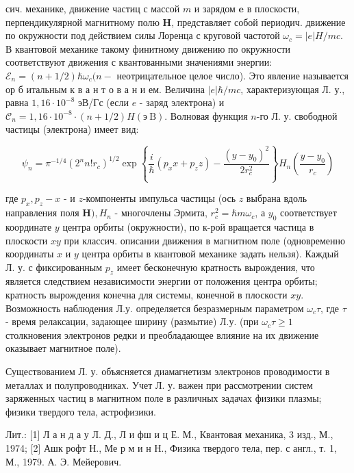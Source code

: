 \documentclass[10pt]{article}
\begin{document}
сич. механике, движение частиц с массой $m$ и зарядом $\boldsymbol{e}$ в плоскости, перпендикулярной магнитному полю $\boldsymbol{H}$, представляет собой периодич. движение по окружности под действием силы Лоренца с круговой частотой $\omega_{c}=|e| H / m c$. В квантовой механике такому финитному движению по окружности соответствуют движения с квантованными значениями энергии: $\mathscr{E}_{n}=(n+1 / 2) \hbar \omega_{c}(n-$ неотрицательное целое число). Это явление называется ор б итальным к в а н т о в а н и ем. Величина $|e| \hbar / m c$, характеризующая Л. у., равна $1,16 \cdot 10^{-8}$ эВ/Гс (если $e$ - заряд электрона) и $\mathscr{C}_{n}=1,16 \cdot 10^{-8} \cdot(n+1 / 2) H(э \mathrm{~B})$. Волновая функция $n$-го Л. у. свободной частицы (электрона) имеет вид:



\[

\psi_{n}=\pi^{-1 / 4}\left(2^{n} n ! r_{c}\right)^{1 / 2} \exp \left\{\frac{i}{\hbar}\left(p_{x} x+p_{z} z\right)-\frac{\left(y-y_{0}\right)^{2}}{2 r_{c}^{2}}\right\} H_{n}\left(\frac{y-y_{0}}{r_{c}}\right)

\]



где $p_{x}, p_{z}-x$ - и $z$-компоненты импульса частицы (ось $z$ выбрана вдоль направления поля $\boldsymbol{H}), H_{n}$ - многочлены Эрмита, $r_{c}^{2}=\hbar m \omega_{c}$, а $y_{0}$ соответствует координате $y$ центра орбиты (окружности), по к-рой вращается частица в плоскости $x y$ при классич. описании движения в магнитном поле (одновременно координаты $x$ и $y$ центра орбиты в квантовой механике задать нельзя). Каждый Л. у. с фиксированным $p_{z}$ имеет бесконечную кратность вырождения, что является следствием независимости энергии от положения центра орбиты; кратность вырождения конечна для системы, конечной в плоскости $x y$. Возможность наблюдения Л.у. определяется безразмерным параметром $\omega_{c} \tau$, где $\tau$ - время релаксации, задающее ширину (размытие) Л.у. (при $\omega_{c} \tau \geqslant 1$ столкновения электронов редки и преобладающее влияние на их движение оказывает магнитное поле).



Существованием Л. у. объясняется диамагнетизм электронов проводимости в металлах и полупроводниках. Учет Л. у. важен при рассмотрении систем заряженных частиц в магнитном поле в различных задачах физики плазмы; физики твердого тела, астрофизики.



Лит.: [1] Л а н д а у Л. Д., Л и фш и ц Е. М., Квантовая механика, 3 изд., М., 1974; [2] Ашк рофт Н., Ме р м и н Н., Физика твердого тела, пер. с англ., т. 1, М., 1979. А. Э. Мейерович.
\end{document}
